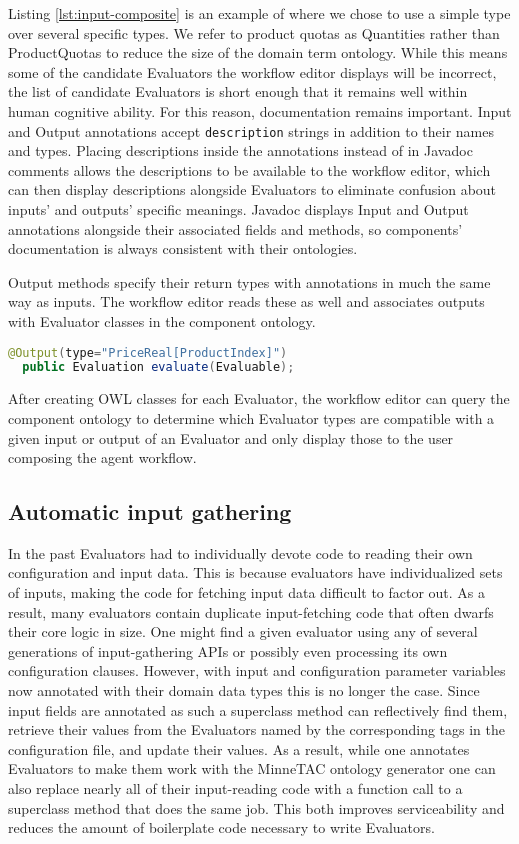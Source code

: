 \documentclass{article}
\begin{document}
Listing \ref{lst:input-composite} is an example of where we chose to use a simple type over several specific types.
We refer to product quotas as Quantities rather than ProductQuotas to reduce the size of the domain term ontology.
While this means some of the candidate Evaluators the workflow editor displays will be incorrect, the list of candidate Evaluators is short enough that it remains well within human cognitive ability.
For this reason, documentation remains important.
Input and Output annotations accept \texttt{description} strings in addition to their names and types.
Placing descriptions inside the annotations instead of in Javadoc comments allows the descriptions to be available to the workflow editor, which can then display descriptions alongside Evaluators to eliminate confusion about inputs' and outputs' specific meanings.
Javadoc displays Input and Output annotations alongside their associated fields and methods, so components' documentation is always consistent with their ontologies.

Output methods specify their return types with annotations in much the same way as inputs.
The workflow editor reads these as well and associates outputs with Evaluator classes in the component ontology.

{\small
\begin{lstlisting}[language={Java},frame={single},label={lst:output},caption={An Output annotation}]
  @Output(type="PriceReal[ProductIndex]")
  public Evaluation evaluate(Evaluable);
\end{lstlisting}
}

After creating OWL classes for each Evaluator, the workflow editor can query the component ontology to determine which Evaluator types are compatible with a given input or output of an Evaluator and only display those to the user composing the agent workflow.

\subsection{Automatic input gathering}

In the past Evaluators had to individually devote code to reading their own configuration and input data.
This is because evaluators have individualized sets of inputs, making the code for fetching input data difficult to factor out.
As a result, many evaluators contain duplicate input-fetching code that often dwarfs their core logic in size.
One might find a given evaluator using any of several generations of input-gathering APIs or possibly even processing its own configuration clauses.
However, with input and configuration parameter variables now annotated with their domain data types this is no longer the case.
Since input fields are annotated as such a superclass method can reflectively find them, retrieve their values from the Evaluators named by the corresponding tags in the configuration file, and update their values.
As a result, while one annotates Evaluators to make them work with the MinneTAC ontology generator one can also replace nearly all of their input-reading code with a function call to a superclass method that does the same job.
This both improves serviceability and reduces the amount of boilerplate code necessary to write Evaluators.
\end{document}

